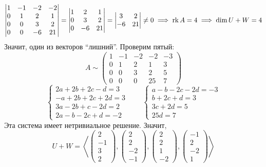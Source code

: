 $$
\begin{vmatrix}
	1 & -1 & -2 & -2 \\
    0 & 1 & 2 & 1 \\
    0 & 0 & 3 & 2 \\
    0 & 0 & -6 & 21
\end{vmatrix} =
\begin{vmatrix}
	1 & 2 & 1 \\
    0 & 3 & 2 \\
    0 & -6 & 21
\end{vmatrix} =
\begin{vmatrix}
	3 & 2 \\
    -6 & 21
\end{vmatrix} \ne 0 \implies \operatorname{rk} A = 4 \implies \dim U + W = 4 $$
Значит, один из векторов ``лишний''. Проверим пятый:
$$ A \sim
\begin{pmatrix}
    1 & -1 & -2 & -2 & -3 \\
    0 & 1 & 2 & 1 & 3 \\
    0 & 0 & 3 & 2 & 5 \\
    0 & 0 & 0 & 25 & 7
\end{pmatrix} $$
$$
\begin{cases}
	2a + 2b + 2c - d = 3 \\
    -a + 2b + 2c + 2d = 3 \\
    3a - 2b + c - 2d = 2 \\
    2a - b - 2c + d = -2
\end{cases} \qquad
\begin{cases}
	a - b - 2c - 2d = -3 \\
    b + 2c + d = 3 \\
    3c + 2d = 5 \\
    25d = 7
\end{cases} $$
Эта система имеет нетривиальное решение. Значит,
$$ U + W = \left\langle
\begin{pmatrix}
	2 \\
    -1 \\
    3 \\
    2
\end{pmatrix},
\begin{pmatrix}
	2 \\
    2 \\
    -2 \\
    -1
\end{pmatrix},
\begin{pmatrix}
	2 \\
    2 \\
    1 \\
    -2
\end{pmatrix},
\begin{pmatrix}
	-1 \\
    2 \\
    -2 \\
    1
\end{pmatrix} \right\rangle $$
